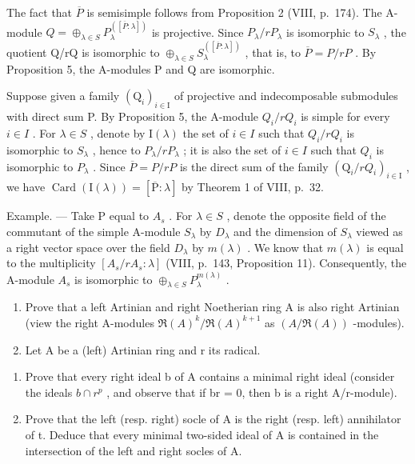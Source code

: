 The fact that \(\overline{P}\) is semisimple follows from Proposition 2 (VIII, p.~174). The A-module \(Q = \oplus_{\lambda \in S} P_{\lambda}^{([\overline{P}: \lambda])}\) is projective. Since \(P_{\lambda}/rP_{\lambda}\) is isomorphic to \(S_{\lambda}\) , the quotient Q/rQ is isomorphic to \(\oplus_{\lambda \in S} S_{\lambda}^{([\overline{P}: \lambda])}\) , that is, to \(\overline{P} = P/rP\) . By Proposition 5, the A-modules P and Q are isomorphic.

Suppose given a family \((\mathrm{Q}_{i})_{i\in\mathrm{I}}\) of projective and indecomposable submodules with direct sum P. By Proposition 5, the A-module \(Q_{i}/rQ_{i}\) is simple for every \(i\in I\) . For \(\lambda\in S\) , denote by \(\mathrm{I}(\lambda)\) the set of \(i\in I\) such that \(Q_{i}/rQ_{i}\) is isomorphic to \(S_{\lambda}\) , hence to \(P_{\lambda}/rP_{\lambda}\) ; it is also the set of \(i\in I\) such that \(Q_{i}\) is isomorphic to \(P_{\lambda}\) . Since \(\overline{P}=P/rP\) is the direct sum of the family \((\mathrm{Q}_{i}/rQ_{i})_{i\in\mathrm{I}}\) , we have \(\operatorname{Card}(\mathrm{I}(\lambda))=[\overline{\mathrm{P}}:\lambda]\) by Theorem 1 of VIII, p.~32.

Example. --- Take P equal to \(A_{s}\) . For \(\lambda \in S\) , denote the opposite field of the commutant of the simple A-module \(S_{\lambda}\) by \(D_{\lambda}\) and the dimension of \(S_{\lambda}\) viewed as a right vector space over the field \(D_{\lambda}\) by \(m(\lambda)\) . We know that \(m(\lambda)\) is equal to the multiplicity \([A_{s}/rA_{s} : \lambda]\) (VIII, p.~143, Proposition 11). Consequently, the A-module \(A_{s}\) is isomorphic to \(\oplus_{\lambda \in S} P_{\lambda}^{m(\lambda)}\) .


\begin{enumerate}
\def\labelenumi{\arabic{enumi})}
\item
  Prove that a left Artinian and right Noetherian ring A is also right Artinian (view the right A-modules \(\Re(A)^{k}/\Re(A)^{k+1}\) as \((A/\Re(A))\) -modules).
\item
  Let A be a (left) Artinian ring and r its radical.
\end{enumerate}

\begin{enumerate}
\def\labelenumi{\alph{enumi})}
\item
  Prove that every right ideal b of A contains a minimal right ideal (consider the ideals \(b \cap r^{p}\) , and observe that if br = 0, then b is a right A/r-module).
\item
  Prove that the left (resp. right) socle of A is the right (resp. left) annihilator of t. Deduce that every minimal two-sided ideal of A is contained in the intersection of the left and right socles of A.
\end{enumerate}

